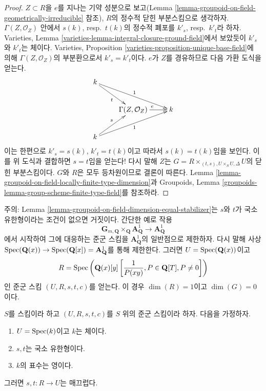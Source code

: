 \begin{proof}
$Z \subset R$을 $e$를 지나는 기약 성분으로 보고(Lemma
\ref{lemma-groupoid-on-field-geometrically-irreducible} 참조), $R$의 정수적
닫힌 부분스킴으로 생각하자. $\Gamma(Z, \mathcal{O}_Z)$ 안에서
$s(k)$, resp.\ $t(k)$의 정수적 폐포를 $k'_s$, resp.\ $k'_t$라 하자.
Varieties, Lemma \ref{varieties-lemma-integral-closure-ground-field}에서 보았듯이
$k'_s$와 $k'_t$는 체이다. Varieties, Proposition
\ref{varieties-proposition-unique-base-field}에 의해
$\Gamma(Z, \mathcal{O}_Z)$의 부분환으로서 $k'_s = k'_t$이다.
$e$가 $Z$를 경유하므로 다음 가환 도식을 얻는다.
$$
\xymatrix{
k \ar[rd]_t \ar[rrd]^1 \\
& \Gamma(Z, \mathcal{O}_Z) \ar[r]^e & k \\
k \ar[ru]^s \ar[rru]_1
}
$$
이는 한편으로 $k'_s = s(k)$, $k'_t = t(k)$이고 따라서
$s(k) = t(k)$임을 보인다. 이를 위 도식과 결합하면 $s = t$임을 얻는다!
다시 말해 $Z$는 $G = R \times_{(t, s), U \times_S U, \Delta} U$의
닫힌 부분스킴이다. $G$와 $R$은 모두 등차원이므로 결론이 따른다. Lemma
\ref{lemma-groupoid-on-field-locally-finite-type-dimension}과 Groupoids, Lemma
\ref{groupoids-lemma-group-scheme-finite-type-field}를 참조하라.
\end{proof}

\begin{remark}
\label{remark-warn-dimension-groupoid-on-field}
주의:
Lemma \ref{lemma-groupoid-on-field-dimension-equal-stabilizer}는
$s$와 $t$가 국소 유한형이라는 조건이 없으면 거짓이다. 간단한 예로 작용
$$
\mathbf{G}_{m, \mathbf{Q}} \times_{\mathbf{Q}} \mathbf{A}^1_{\mathbf{Q}}
\to \mathbf{A}^1_{\mathbf{Q}}
$$
에서 시작하여 그에 대응하는 준군 스킴을 $\mathbf{A}^1_{\mathbf{Q}}$의
일반점으로 제한하자. 다시 말해 사상
$\mathop{\mathrm{Spec}}(\mathbf{Q}(x)) \to
\mathop{\mathrm{Spec}}(\mathbf{Q}[x]) = \mathbf{A}^1_{\mathbf{Q}}$를 통해 제한한다.
그러면 $U = \mathop{\mathrm{Spec}}(\mathbf{Q}(x))$이고
$$
R = \mathop{\mathrm{Spec}}\left(
\mathbf{Q}(x)[y]\left[
\frac{1}{P(xy)}, P \in \mathbf{Q}[T], P \not = 0
\right]
\right)
$$
인 준군 스킴 $(U, R, s, t, c)$를 얻는다. 이 경우
$\dim(R) = 1$이고 $\dim(G) = 0$이다.
\end{remark}

\begin{lemma}
\label{lemma-groupoid-characteristic-zero-smooth}
$S$를 스킴이라 하고 $(U, R, s, t, c)$를 $S$ 위의 준군 스킴이라 하자.
다음을 가정하자.
\begin{enumerate}
\item $U = \mathop{\mathrm{Spec}}(k)$이고 $k$는 체이다.
\item $s, t$는 국소 유한형이다.
\item $k$의 표수는 영이다.
\end{enumerate}
그러면 $s, t : R \to U$는 매끄럽다.
\end{lemma}

